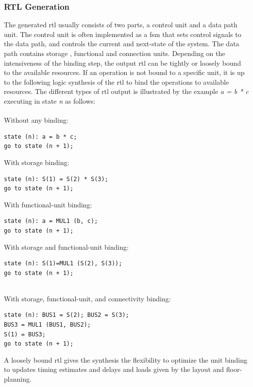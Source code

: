 \subsubsection{RTL Generation}

The generated \gls{rtl} usually consists of two parts, a control unit and a data path unit. The control unit is often implemented as a \gls{fsm} that sets control signals to the data path, and controls the current and next-state of the system. The data path contains storage , functional and connection units. Depending on the intensiveness of the binding step, the output \gls{rtl} can be tightly or loosely bound to the available resources. If an operation is not bound to a specific unit, it is up to the following logic synthesis of the \gls{rtl} to bind the operations to available resources. The different types of \gls{rtl} output is illustrated by the example \textit{a = b * c} executing in state \textit{n} as follows:\\
\\
Without any binding:\hfill\vspace{-\baselineskip}
\begin{verbatim}
state (n): a = b * c;
go to state (n + 1);
\end{verbatim}
With storage binding:\hfill\vspace{-\baselineskip}
\begin{verbatim}
state (n): S(1) = S(2) * S(3);
go to state (n + 1);
\end{verbatim}
With functional-unit binding:\hfill\vspace{-\baselineskip}
\begin{verbatim}
state (n): a = MUL1 (b, c);
go to state (n + 1);
\end{verbatim}
With storage and functional-unit binding:\hfill\vspace{-\baselineskip}
\begin{verbatim}
state (n): S(1)=MUL1 (S(2), S(3));
go to state (n + 1);
\end{verbatim}\\
\clearpage
With storage, functional-unit, and connectivity binding:\hfill\vspace{-\baselineskip}
\begin{verbatim}
state (n): BUS1 = S(2); BUS2 = S(3);
BUS3 = MUL1 (BUS1, BUS2);
S(1) = BUS3;
go to state (n + 1);
\end{verbatim}
A loosely bound \gls{rtl} gives the synthesis the flexibility to optimize the unit binding to updates timing estimates and delays and loads given by the layout and floor-planning.

